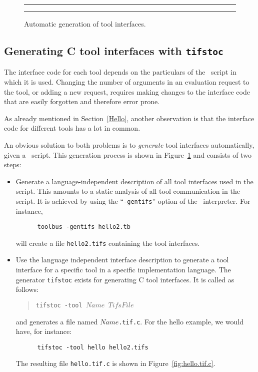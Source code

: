 \documentclass[a4,twoside,noweb]{article} %
\begin{document}
\begin{figure}[h]
\rule{\textwidth}{0.5mm}
    
  \centerline{\box\graph}
  \caption{Automatic generation of tool interfaces.}
  \label{fig:Tifs}
\rule{\textwidth}{0.5mm}
\end{figure}

\subsection{\label{ctif}Generating C tool interfaces with {\tt tifstoc}}

The interface code for each tool depends on the particulars
of the \T\ script in which it is used. Changing the number
of arguments in an evaluation request to the tool,
or adding a new request, requires making changes to the interface
code that are easily forgotten and therefore error prone.

As already mentioned in Section~\ref{Hello}, another observation
is that the interface code for different tools has a lot in common.

An obvious solution to both problems is to {\em generate}
tool interfaces automatically, given a \T\ script.
This generation process is shown in Figure~\ref{fig:Tifs}
and consists of two steps:

\begin{itemize}
\item Generate a language-independent
description of all tool interfaces used in the script.
This amounts to a static analysis of all tool communication
in the script. It is achieved by using the ``{\tt -gentifs}''
option of the \TB\ interpreter. For instance,
\begin{verbatim}
      toolbus -gentifs hello2.tb
\end{verbatim}
will create a file {\tt hello2.tifs} containing the tool interfaces.

\item Use the language independent interface description
to generate a tool interface for a specific tool in a specific
implementation language. The generator {\tt tifstoc}
exists for generating C tool interfaces. It is called as follows:
\begin{quote}
      {\tt tifstoc -tool $Name  $ $TifsFile$}
\end{quote}
and generates a file named {\tt $Name$.tif.c}.
For the hello example, we would have, for instance:
\begin{verbatim}
      tifstoc -tool hello hello2.tifs
\end{verbatim}
The resulting file {\tt hello.tif.c} is shown in
Figure~\ref{fig:hello.tif.c}.
\end{itemize}
\end{document}
